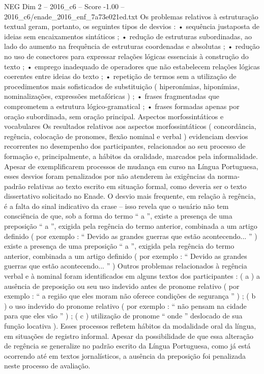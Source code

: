 \begin{textsample}{NEG Dim 2 – 2016\_c6 – Score -1.00 – 2016\_c6/enade\_2016\_enf\_7a73e021ed.txt}
Os problemas relativos à estruturação textual geram, portanto, os seguintes tipos de desvios : • sequência justaposta de ideias sem encaixamentos sintáticos ; • redução de estruturas subordinadas, ao lado do aumento na frequência de estruturas coordenadas e absolutas ; • redução no uso de conectores para expressar relações lógicas essenciais à construção do texto ; • emprego inadequado de operadores que não estabelecem relações lógicas coerentes entre ideias do texto ; • repetição de termos sem a utilização de procedimentos mais sofisticados de substituição ( hiperonímias, hiponímias, nominalizações, expressões metafóricas ) ; • frases fragmentadas que comprometem a estrutura lógico-gramatical ; • frases formadas apenas por oração subordinada, sem oração principal.
Aspectos morfossintáticos e vocabulares Os resultados relativos aos aspectos morfossintáticos ( concordância, regência, colocação de pronomes, flexão nominal e verbal ) evidenciam desvios recorrentes no desempenho dos participantes, relacionados ao seu processo de formação e, principalmente, a hábitos da oralidade, marcados pela informalidade.
Apesar de exemplificarem processos de mudança em curso na Língua Portuguesa, esses desvios foram penalizados por não atenderem às exigências da norma-padrão relativas ao texto escrito em situação formal, como deveria ser o texto dissertativo solicitado no Enade.
O desvio mais frequente, em relação à regência, é a falta do sinal indicativo da crase – isso revela que o usuário não tem consciência de que, sob a forma do termo “ a ”, existe a presença de uma preposição “ a ”, exigida pela regência do termo anterior, combinada a um artigo definido ( por exemplo : “ Devido as grandes guerras que estão acontecendo... ” ) existe a presença de uma preposição “ a ”, exigida pela regência do termo anterior, combinada a um artigo definido ( por exemplo : “ Devido as grandes guerras que estão acontecendo... ” ) Outros problemas relacionados à regência verbal e à nominal foram identificados em alguns textos dos participantes : ( a ) a ausência de preposição ou seu uso indevido antes de pronome relativo ( por exemplo : “ a região que eles moram não oferece condições de segurança ” ) ; ( b ) o uso indevido do pronome relativo ( por exemplo : “ não pensam na cidade para que eles vão ” ) ; ( c ) utilização de pronome “ onde ” deslocado de sua função locativa ).
Esses processos refletem hábitos da modalidade oral da língua, em situações de registro informal.
Apesar da possibilidade de que essa alteração de regência se generalize no padrão escrito da Língua Portuguesa, como já está ocorrendo até em textos jornalísticos, a ausência da preposição foi penalizada neste processo de avaliação.

\end{textsample}
